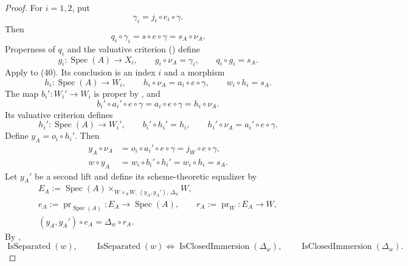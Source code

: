 \begin{proof}
  For $i=1,2$, put
  \[
    \gamma_i=j_i\circ e_i\circ\gamma.
  \]
  Then
  \[
    q_i\circ\gamma_i
      =s\circ e\circ\gamma
      =s_A\circ\nu_A.
  \]
  Properness of $q_i$ and the valuative criterion
  (\cite[\href{https://stacks.math.columbia.edu/tag/0BX5}{Tag 0BX5}]
  {stacks-project}) define
  \[
    g_i\colon\operatorname{Spec}(A)\to X_i,\qquad
    g_i\circ\nu_A=\gamma_i,\qquad q_i\circ g_i=s_A.                \tag{40}
  \]
  Apply  to (40).  Its
  conclusion is an index $i$ and a morphism
  \[
    h_i\colon\operatorname{Spec}(A)\to W_i,\qquad
    h_i\circ\nu_A=a_i\circ e\circ\gamma,\qquad
    w_i\circ h_i=s_A.                                              \tag{41}
  \]
  The map $b_i'\colon W_i'\to W_i$ is proper by
  , and
  \[
    b_i'\circ a_i'\circ e\circ\gamma
      =a_i\circ e\circ\gamma
      =h_i\circ\nu_A.
  \]
  Its valuative criterion defines
  \[
    h_i'\colon\operatorname{Spec}(A)\to W_i',\qquad
    b_i'\circ h_i'=h_i,\qquad
    h_i'\circ\nu_A=a_i'\circ e\circ\gamma.                         \tag{42}
  \]
  Define $y_A=o_i\circ h_i'$.  Then
  \[
  \begin{aligned}
    y_A\circ\nu_A
      &=o_i\circ a_i'\circ e\circ\gamma
       =j_W\circ e\circ\gamma,\\
    w\circ y_A
      &=w_i\circ b_i'\circ h_i'
       =w_i\circ h_i
       =s_A.
  \end{aligned}
  \]
  Let $y_A'$ be a second lift and define its scheme-theoretic equalizer by
  \[
  \begin{gathered}
    E_A:=\operatorname{Spec}(A)
      \times_{W\times_SW,\,(y_A,y_A'),\,\Delta_w}W,\\
    e_A:=\operatorname{pr}_{\operatorname{Spec}(A)}
      \colon E_A\to\operatorname{Spec}(A),\qquad
    r_A:=\operatorname{pr}_W\colon E_A\to W,\\
    (y_A,y_A')\circ e_A=\Delta_w\circ r_A.
  \end{gathered}                                                   \tag{42a}
  \]
  By ,
  \[
    \operatorname{IsSeparated}(w),
    \qquad
    \operatorname{IsSeparated}(w)
      \Longleftrightarrow\operatorname{IsClosedImmersion}(\Delta_w),
    \qquad
    \operatorname{IsClosedImmersion}(\Delta_w).
\]
\end{proof}
